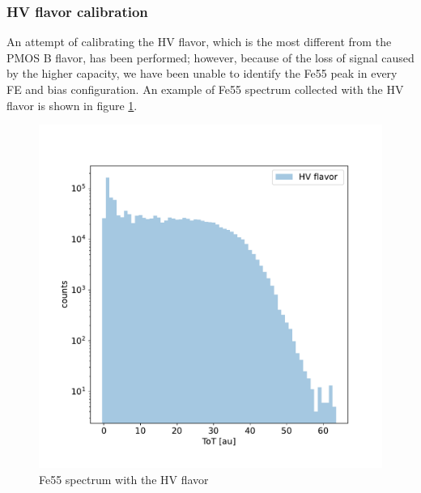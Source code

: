         \subsubsection{HV flavor calibration}
        An attempt of calibrating the HV flavor, which is the most different from the PMOS B flavor, has been performed; however, because of the loss of signal caused by the higher capacity, we have been unable to identify the Fe55 peak in every FE and bias configuration. An example of Fe55 spectrum collected with the HV flavor is shown in figure \ref{fig:HV_fe55}. 
        \begin{figure}[h!]
            \centering
            \includegraphics[width=.55\linewidth]{figures/charaterization/Fe55_HV.pdf}
            \caption{Fe55 spectrum with the HV flavor}
            \label{fig:HV_fe55}
        \end{figure}  

